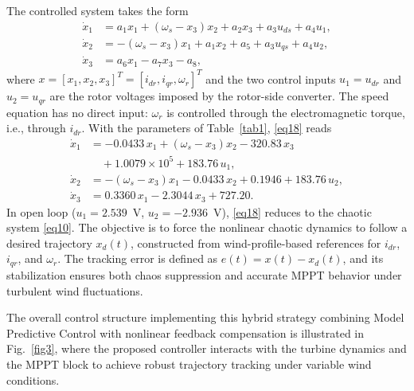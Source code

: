 \documentclass[conference]{IEEEtran}
\begin{document}
The controlled system takes the form
\begin{equation}
\begin{aligned}
\dot{x}_{1} &= a_{1}x_{1} + \left( \omega_{s} - x_{3} \right)x_{2} + a_{2}x_{3} + a_{3}u_{ds} + a_{4}u_{1}, \\
\dot{x}_{2} &= - \left( \omega_{s} - x_{3} \right)x_{1} + a_{1}x_{2} + a_{5} + a_{3}u_{qs} + a_{4}u_{2}, \\
\dot{x}_{3} &= a_{6}x_{1} - a_{7}x_{3} - a_{8},
\end{aligned}
\label{eq18}
\end{equation}
where $x = \left\lbrack x_{1},x_{2},x_{3} \right\rbrack^{T} = \left\lbrack i_{dr},i_{qr},\omega_{r} \right\rbrack^{T}$ and the two control inputs $u_{1} = u_{dr}$ and $u_{2} = u_{qr}$ are the rotor voltages imposed by the rotor-side converter. The speed equation has no direct input: $\omega_{r}$ is controlled through the electromagnetic torque, i.e., through $i_{dr}$. With the parameters of Table~\ref{tab1}, \eqref{eq18} reads
\begin{equation*}
\begin{aligned}
\dot{x}_{1} &= -0.0433\,x_{1} + \left( \omega_{s} - x_{3} \right)x_{2} - 320.83\,x_{3} \\
&\quad + 1.0079\times10^{5} + 183.76\,u_{1}, \\
\dot{x}_{2} &= - \left( \omega_{s} - x_{3} \right)x_{1} - 0.0433\,x_{2} + 0.1946 + 183.76\,u_{2}, \\
\dot{x}_{3} &= 0.3360\,x_{1} - 2.3044\,x_{3} + 727.20 .
\end{aligned}
\end{equation*}
In open loop ($u_{1} = 2.539$~V, $u_{2} = -2.936$~V), \eqref{eq18} reduces to the chaotic system \eqref{eq10}. The objective is to force the nonlinear chaotic dynamics to follow a desired trajectory $x_{d}(t)$, constructed from wind-profile-based references for $i_{dr}$, $i_{qr}$, and $\omega_{r}$. The tracking error is defined as $e(t) = x(t) - x_{d}(t)$, and its stabilization ensures both chaos suppression and accurate MPPT behavior under turbulent wind fluctuations.

The overall control structure implementing this hybrid strategy combining Model Predictive Control with nonlinear feedback compensation is illustrated in Fig.~\ref{fig3}, where the proposed controller interacts with the turbine dynamics and the MPPT block to achieve robust trajectory tracking under variable wind conditions.
\end{document}
